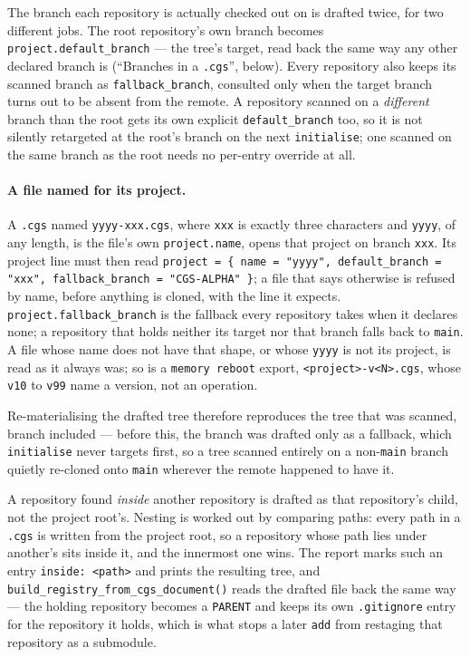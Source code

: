 The branch each repository is actually checked out on is drafted twice, for
two different jobs. The root repository's own branch becomes
\texttt{project.default\_branch} --- the tree's target, read back the same
way any other declared branch is (``Branches in a \texttt{.cgs}'', below).
Every repository also keeps its scanned branch as \texttt{fallback\_branch},
consulted only when the target branch turns out to be absent from the
remote. A repository scanned on a \emph{different} branch than the root
gets its own explicit \texttt{default\_branch} too, so it is not silently
retargeted at the root's branch on the next \texttt{initialise}; one
scanned on the same branch as the root needs no per-entry override at all.
\paragraph{A file named for its project.} A \texttt{.cgs} named
\texttt{yyyy-xxx.cgs}, where \texttt{xxx} is exactly three characters and
\texttt{yyyy}, of any length, is the file's own \texttt{project.name}, opens
that project on branch \texttt{xxx}. Its project line must then read
\texttt{project = \{ name = "yyyy", default\_branch = "xxx", fallback\_branch =
"CGS-ALPHA" \}}; a file that says otherwise is refused by name, before anything is
cloned, with the line it expects. \texttt{project.fallback\_branch} is the
fallback every repository takes when it declares none; a repository that holds
neither its target nor that branch falls back to \texttt{main}. A file whose
name does not have that shape, or whose \texttt{yyyy} is not its project, is read
as it always was; so is a \texttt{memory reboot} export, \texttt{<project>-v<N>.cgs}, whose
\texttt{v10} to \texttt{v99} name a version, not an operation.

Re-materialising the drafted tree therefore reproduces the tree that was
scanned, branch included --- before this, the branch was drafted only as a
fallback, which \texttt{initialise} never targets first, so a tree scanned
entirely on a non-\texttt{main} branch quietly re-cloned onto \texttt{main}
wherever the remote happened to have it.

A repository found \emph{inside} another repository is drafted as that
repository's child, not the project root's. Nesting is worked out by
comparing paths: every path in a \texttt{.cgs} is written from the project
root, so a repository whose path lies under another's sits inside it, and
the innermost one wins. The report marks such an entry
\texttt{inside: <path>} and prints the resulting tree, and
\texttt{build\_registry\_from\_cgs\_document()} reads the drafted file back
the same way --- the holding repository becomes a \texttt{PARENT} and keeps
its own \texttt{.gitignore} entry for the repository it holds, which is
what stops a later \texttt{add} from restaging that repository as a
submodule.

